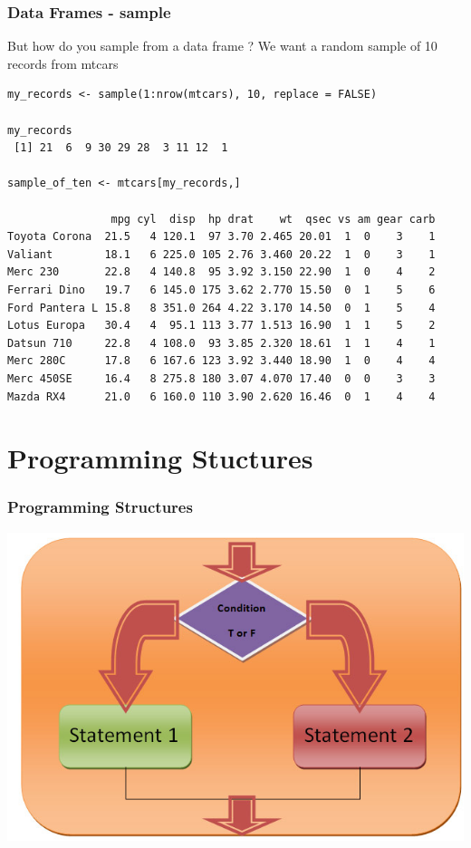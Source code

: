 \documentclass{beamer}
\begin{document}
\begin{frame}[fragile]
\frametitle{Data Frames - sample}
But how do you sample from a data frame ? We want a random sample of 10 records from mtcars 
\footnotesize
\begin{verbatim}
my_records <- sample(1:nrow(mtcars), 10, replace = FALSE)

my_records
 [1] 21  6  9 30 29 28  3 11 12  1

sample_of_ten <- mtcars[my_records,]

                mpg cyl  disp  hp drat    wt  qsec vs am gear carb 
Toyota Corona  21.5   4 120.1  97 3.70 2.465 20.01  1  0    3    1      
Valiant        18.1   6 225.0 105 2.76 3.460 20.22  1  0    3    1      
Merc 230       22.8   4 140.8  95 3.92 3.150 22.90  1  0    4    2      
Ferrari Dino   19.7   6 145.0 175 3.62 2.770 15.50  0  1    5    6      
Ford Pantera L 15.8   8 351.0 264 4.22 3.170 14.50  0  1    5    4      
Lotus Europa   30.4   4  95.1 113 3.77 1.513 16.90  1  1    5    2      
Datsun 710     22.8   4 108.0  93 3.85 2.320 18.61  1  1    4    1      
Merc 280C      17.8   6 167.6 123 3.92 3.440 18.90  1  0    4    4      
Merc 450SE     16.4   8 275.8 180 3.07 4.070 17.40  0  0    3    3      
Mazda RX4      21.0   6 160.0 110 3.90 2.620 16.46  0  1    4    4      

\end{verbatim}
\end{frame}


\section{Programming Stuctures}

\begin{frame}[fragile]
\frametitle{Programming Structures}
\begin{center}
\includegraphics{../IMG/control.png}
\end{center}
\end{frame}
\end{document}
